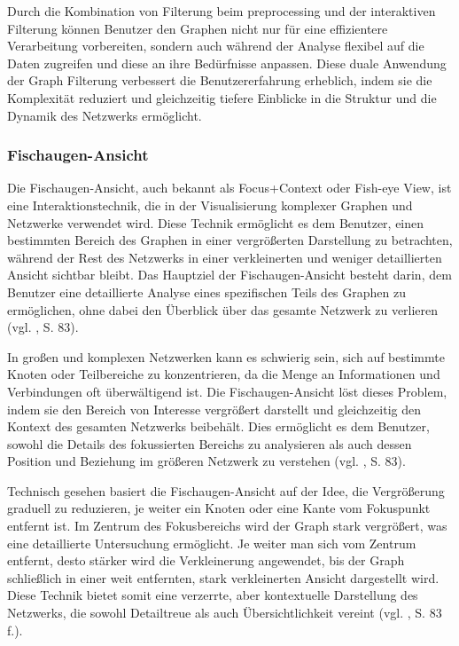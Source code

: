 Durch die Kombination von Filterung beim preprocessing und der interaktiven Filterung können Benutzer den Graphen nicht nur für eine effizientere Verarbeitung vorbereiten, sondern auch während der Analyse flexibel auf die Daten zugreifen und diese an ihre Bedürfnisse anpassen. Diese duale Anwendung der Graph Filterung verbessert die Benutzererfahrung erheblich, indem sie die Komplexität reduziert und gleichzeitig tiefere Einblicke in die Struktur und die Dynamik des Netzwerks ermöglicht.

\subsubsection{Fischaugen-Ansicht}

Die Fischaugen-Ansicht, auch bekannt als Focus+Context oder Fish-eye View, ist eine Interaktionstechnik, die in der Visualisierung komplexer Graphen und Netzwerke verwendet wird. Diese Technik ermöglicht es dem Benutzer, einen bestimmten Bereich des Graphen in einer vergrößerten Darstellung zu betrachten, während der Rest des Netzwerks in einer verkleinerten und weniger detaillierten Ansicht sichtbar bleibt. Das Hauptziel der Fischaugen-Ansicht besteht darin, dem Benutzer eine detaillierte Analyse eines spezifischen Teils des Graphen zu ermöglichen, ohne dabei den Überblick über das gesamte Netzwerk zu verlieren (vgl. \cite{fisheye:Sarkar}, S. 83).

In großen und komplexen Netzwerken kann es schwierig sein, sich auf bestimmte Knoten oder Teilbereiche zu konzentrieren, da die Menge an Informationen und Verbindungen oft überwältigend ist. Die Fischaugen-Ansicht löst dieses Problem, indem sie den Bereich von Interesse vergrößert darstellt und gleichzeitig den Kontext des gesamten Netzwerks beibehält. Dies ermöglicht es dem Benutzer, sowohl die Details des fokussierten Bereichs zu analysieren als auch dessen Position und Beziehung im größeren Netzwerk zu verstehen (vgl. \cite{fisheye:Sarkar}, S. 83).

Technisch gesehen basiert die Fischaugen-Ansicht auf der Idee, die Vergrößerung graduell zu reduzieren, je weiter ein Knoten oder eine Kante vom Fokuspunkt entfernt ist. Im Zentrum des Fokusbereichs wird der Graph stark vergrößert, was eine detaillierte Untersuchung ermöglicht. Je weiter man sich vom Zentrum entfernt, desto stärker wird die Verkleinerung angewendet, bis der Graph schließlich in einer weit entfernten, stark verkleinerten Ansicht dargestellt wird. Diese Technik bietet somit eine verzerrte, aber kontextuelle Darstellung des Netzwerks, die sowohl Detailtreue als auch Übersichtlichkeit vereint (vgl. \cite{fisheye:Sarkar}, S. 83 f.).


